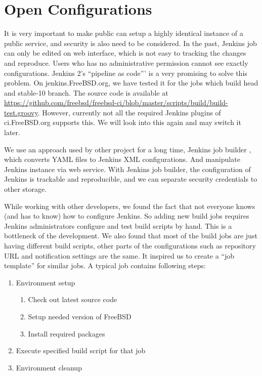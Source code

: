 \documentclass[a4paper,twocolumn,10pt]{article}
\begin{document}
\section{Open Configurations}
It is very important to make public can setup a highly identical instance of a
public service, and security is also need to be considered. In the past,
Jenkins job can only be edited on web interface, which is not easy to tracking
the changes and reproduce. Users who has no administrative permission cannot
see exactly configurations. Jenkins 2's ``pipeline as code''' is a very
promising to solve this problem. On jenkins.FreeBSD.org, we have tested it for
the jobs which build head and stable-10 branch. The source code is available at
\url{https://github.com/freebsd/freebsd-ci/blob/master/scripts/build/build-test.groovy}.
However, currently not all the required Jenkins plugins of ci.FreeBSD.org
supports this. We will look into this again and may switch it later.

We use an approach used by other project for a long time, Jenkins job builder
\cite{jenkins-job-builder}, which converts YAML files to Jenkins XML
configurations. And manipulate Jenkins instance via web service. With Jenkins
job builder, the configuration of Jenkins is trackable and reproducible, and we
can separate security credentials to other storage.

While working with other developers, we found the fact that not everyone knows
(and has to know) how to configure Jenkins. So adding new build jobs requires
Jenkins administrators configure and test build scripts by hand. This is a
bottleneck of the development. We also found that most of the build jobs are
just having different build scripts, other parts of the configurations such as
repository URL and notification settings are the same. It inspired us to create
a ``job template'' for similar jobs. A typical job contains following steps:

\begin{enumerate}
\item Environment setup
  \begin{enumerate}
  \item Check out latest source code
  \item Setup needed version of FreeBSD
  \item Install required packages
  \end{enumerate}
\item Execute specified build script for that job
\item Environment cleanup
\end{enumerate}
\end{document}
